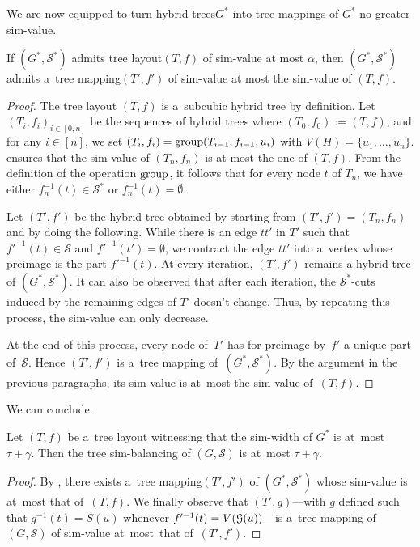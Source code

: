 \documentclass[a4paper,UKenglish,cleveref,hyperref,autoref]{lipics-v2021}
\newcommand{\tmap}{tree mapping\xspace}
\newcommand{\tmaps}{tree mappings\xspace}
\newcommand{\htree}{hybrid tree\xspace}
\newcommand{\htrees}{hybrid trees\xspace}
\begin{document}
We are now equipped to turn \htrees $G^*$ into \tmaps of $G^*$ no greater sim-value.





\begin{lemma}\label{lem:htree-to-tmap}
  If  $(G^*, \mathcal S^*)$ admits tree layout$(T,f)$ of sim-value at most $\alpha$, then $(G^*, \mathcal S^*)$ admits a~\tmap $(T',f')$ of sim-value at most the sim-value of $(T,f)$.
\end{lemma}
\begin{proof}
	The tree layout $(T, f)$ is a~subcubic \htree by definition.
	Let $(T_i, f_i)_{i \in [0,n]}$ be the sequences of hybrid trees where $(T_0,f_0):=(T,f)$, and for any $i \in [n]$, we set $(T_i, f_i) = \text{group}(T_{i-1}, f_{i-1}, u_i)$ with $V(H) = \{u_1, \dots, u_n\}$.
	 ensures that the sim-value of $(T_n,f_n)$ is at most the one of $(T, f)$.
	From the definition of the operation $\text{group}$, it follows that for every node $t$ of $T_n$, we have either $f_n^{-1}(t) \in \mathcal S^*$ or $f_n^{-1}(t) = \emptyset$.
	
	Let $(T',f')$ be the \htree obtained by starting from $(T',f')= (T_n,f_n)$ and by doing the following.
	While there is an edge $tt'$ in $T'$ such that $f'^{-1}(t) \in \mathcal S$ and $f'^{-1}(t') = \emptyset$, we contract the edge $tt'$ into a~vertex whose preimage is the part $f'^{-1}(t)$.
	At every iteration, $(T',f')$ remains a \htree of $(G^*, \mathcal S^*)$.
	It can also be observed that after each iteration, the $\mathcal S^*$-cuts induced by the remaining edges of $T'$ doesn't change.
	Thus, by repeating this process, the sim-value can only decrease.
	
	At the end of this process, every node of~$T'$ has for preimage by~$f'$ a unique part of~$\mathcal S$.
	Hence $(T',f')$ is a~\tmap of~$(G^*,\mathcal S^*)$.
	By the argument in the previous paragraphs, its sim-value is at~most the sim-value of~$(T,f)$.
\end{proof}

We can conclude.

\begin{lemma}
  Let $(T, f)$ be a~tree layout witnessing that the sim-width of $G^*$ is at~most~$\tau+\gamma$.
  Then the tree sim-balancing of $(G,\mathcal S)$ is at~most $\tau+\gamma$.
\end{lemma}
\begin{proof}
  By , there exists a~\tmap $(T',f')$ of $(G^*, \mathcal S^*)$ whose sim-value is at~most that of~$(T, f)$.
  We finally observe that $(T',g)$---with $g$ defined such that $g^{-1}(t) = S(u)$ whenever $f'^{-1}(t) = V(\mathcal G(u))$---is a~\tmap of $(G,\mathcal S)$ of sim-value at~most~that of~$(T',f')$. 
\end{proof}
\end{document}
